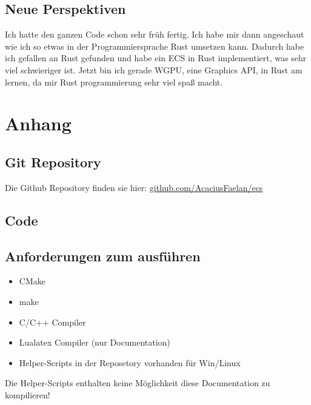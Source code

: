 \documentclass[12pt, a4paper, oneside, ngerman]{scrartcl}
\begin{document}
\subsection{Neue Perspektiven}
Ich hatte den ganzen Code schon sehr früh fertig.
Ich habe mir dann angeschaut wie ich so etwas in der Programmiersprache Rust umsetzen kann.
Dadurch habe ich gefallen an Rust gefunden und habe ein ECS in Rust implementiert, was sehr viel schwieriger ist.
Jetzt bin ich gerade WGPU, eine Graphics API, in Rust am lernen, da mir Rust programmierung sehr viel spaß macht.

\newpage
\appendix
\pagestyle{appendixstyle}
\section{Anhang}
\subsection{Git Repository}
Die Github Repository finden sie hier: \href{https://github.com/AcaciusFaelan/ecs}{github.com/AcaciusFaelan/ecs}

\subsection{Code}





\subsection{Anforderungen zum ausführen}
\begin{itemize}
	\item CMake
	\item make
	\item C/C++ Compiler
	\item Lualatex Compiler (nur Documentation)
	\item Helper-Scripts in der Reposetory vorhanden für Win/Linux
\end{itemize}

\begin{myNote}[Achtung]
	Die Helper-Scripts enthalten keine Möglichkeit diese Documentation zu kompilieren!
\end{myNote}
\end{document}
